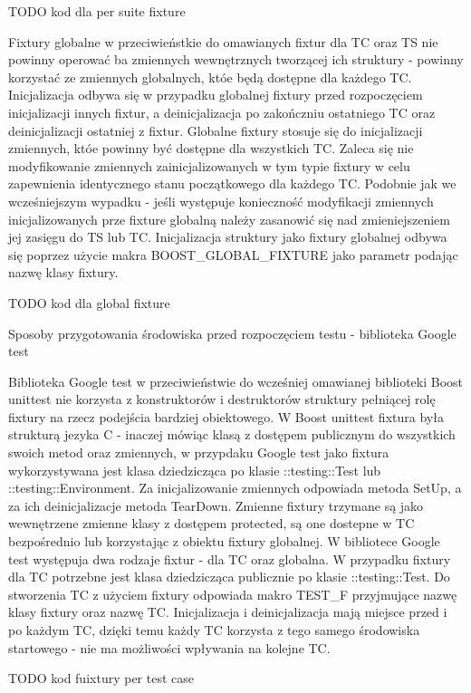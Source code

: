 \documentclass[12pt,a4paper,notitlepage]{report}
\begin{document}
TODO kod dla per suite fixture

Fixtury globalne w przeciwieństkie do omawianych fixtur dla TC oraz TS nie powinny operować ba zmiennych wewnętrznych tworzącej ich struktury - powinny korzystać ze zmiennych globalnych, któe będą dostępne dla każdego TC.
Inicjalizacja odbywa się w przypadku globalnej fixtury przed rozpoczęciem inicjalizacji innych fixtur, a deinicjalizacja po zakończniu ostatniego TC oraz deinicjalizacji ostatniej z fixtur.
Globalne fixtury stosuje się do inicjalizacji zmiennych, któe powinny być dostępne dla wszystkich TC. Zaleca się nie modyfikowanie zmiennych zainicjalizowanych w tym typie fixtury w celu zapewnienia identycznego stanu początkowego dla każdego TC.
Podobnie jak we wcześniejszym wypadku - jeśli występuje konieczność modyfikacji zmiennych inicjalizowanych prze fixture globalną należy zasanowić się nad zmieniejszeniem jej zasięgu do TS lub TC.
Inicjalizacja struktury jako fixtury globalnej odbywa się poprzez użycie makra BOOST_GLOBAL_FIXTURE jako parametr podając nazwę klasy fixtury.

TODO kod dla global fixture

Sposoby przygotowania środowiska przed rozpoczęciem testu - biblioteka Google test

Biblioteka Google test w przeciwieństwie do wcześniej omawianej biblioteki Boost unittest nie korzysta z konstruktorów i destruktorów struktury pełniącej rolę fixtury na rzecz podejścia bardziej obiektowego.
W Boost unittest fixtura była strukturą jezyka C - inaczej mówiąc klasą z dostępem publicznym do wszystkich swoich metod oraz zmiennych, w przypdaku Google test jako fixtura wykorzystywana jest klasa dziedzicząca po klasie ::testing::Test lub ::testing::Environment.
Za inicjalizowanie zmiennych odpowiada metoda SetUp, a za ich deinicjalizacje metoda TearDown.
Zmienne fixtury trzymane są jako wewnętrzene zmienne klasy z dostępem protected, są one dostepne w TC bezpośrednio lub korzystając z obiektu fixtury globalnej.
W bibliotece Google test występuja dwa rodzaje fixtur - dla TC oraz globalna.
W przypadku fixtury dla TC potrzebne jest klasa dziedzicząca publicznie po klasie ::testing::Test. Do stworzenia TC z użyciem fixtury odpowiada makro TEST_F przyjmujące nazwę klasy fixtury oraz nazwę TC. Inicjalizacja i deinicjalizacja mają miejsce przed i po każdym TC, dzięki temu każdy TC korzysta z tego samego środowiska startowego - nie ma możliwości wpływania na kolejne TC.

TODO kod fuixtury per test case
\end{document}

